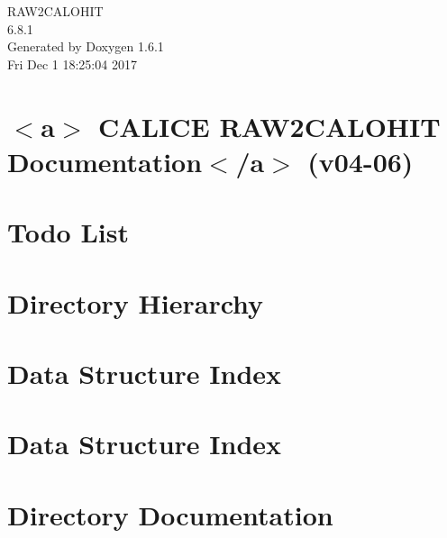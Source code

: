\documentclass[a4paper]{book}
\begin{document}
\begin{titlepage}
\vspace*{7cm}
\begin{center}
{\Large RAW2CALOHIT \\[1ex]\large 6.8.1 }\\
\vspace*{1cm}
{\large Generated by Doxygen 1.6.1}\\
\vspace*{0.5cm}
{\small Fri Dec 1 18:25:04 2017}\\
\end{center}
\end{titlepage}
\clearemptydoublepage
{}
\tableofcontents
\clearemptydoublepage
{}
\chapter{$<$a$>$ CALICE RAW2CALOHIT Documentation$<$/a$>$ (v04-\/06)}
\label{index}
\chapter{Todo List}
\label{todo}

\chapter{Directory Hierarchy}

\chapter{Data Structure Index}

\chapter{Data Structure Index}

\chapter{Directory Documentation}














\end{document}
